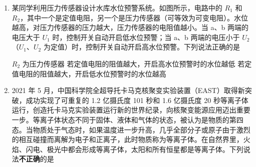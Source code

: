 \documentclass[\gkver]{gaokaozhenti}
\begin{document}
\begin{enumerate}
{C．飞行阶段，运动员所采取的姿态是为了减小水平方向的阻力，从而减小水平方向的加速度，C 错误；

D．着陆阶段，运动员两腿屈膝下蹲可以延长落地时间，根据动量定理可知，可以减少身体受到的平均冲击力，D 错误。

故选 B。
}

\item
某同学利用压力传感器设计水库水位预警系统。如图所示，电路中的 $R_{1}$ 和 $R_{2}$，其中一个是定值电阻，另一个是压力传感器（可等效为可变电阻）。水位越高，对压力传感器的压力越大，压力传感器的电阻值越小。当 a、b 两端的电压大于 $U_{1}$ 时，控制开关自动开启低水位预警；当 a、b 两端的电压小于 $U_{2}$（$U_{1}$、$U_{2}$ 为定值）时，控制开关自动开启高水位预警。下列说法正确的是


{$R_{2}$ 为压力传感器}
{若定值电阻的阻值越大，开启高水位预警时的水位越低}
{若定值电阻的阻值越大，开启低水位预警时的水位越高}


\item
2021 年 5 月，中国科学院全超导托卡马克核聚变实验装置（EAST）取得新突破，成功实现了可重复的 1.2 亿摄氏度 101 秒和 1.6 亿摄氏度 20 秒等离子体运行，创造托卡马克实验装置运行新的世界纪录，向核聚变能源应用迈出重要一步。等离子体状态不同于固体、液体和气体的状态，被认为是物质的第四态。当物质处于气态时，如果温度进一步升高，几乎全部分子或原子由于激烈的相互碰撞而离解为电子和正离子，此时物质称为等离子体。在自然界里，火焰、闪电、极光中都会形成等离子体，太阳和所有恒星都是等离子体。下列说法\textbf{不正确}的是


\end{enumerate}
\end{document}
